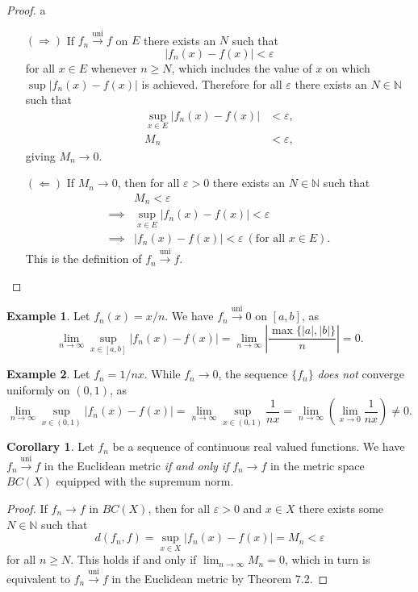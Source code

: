\documentclass{article}
\newcommand{\N}{\mathbb{N}}
\newcommand{\uni}{\overset{\text{uni}}{\to}}
\theoremstyle{definition}
\newtheorem{corollary}{Corollary}[section]
\newtheorem{example}{Example}[section]
\begin{document}
	\begin{proof}{\color{white}a}
		\begin{enumerate}
			\item [$ (\Longrightarrow) $] If $ f_n\uni f $ on $E$ there exists an $ N $ such that $$ |f_n(x)-f(x)|<\varepsilon$$ for all $ x\in E $ whenever $ n\ge N $, which includes the value of $ x $ on which $\sup |f_n(x)-f(x)| $ is achieved. Therefore for all $ \varepsilon $ there exists an $ N\in\N $ such that
			\begin{align*}
				\sup_{x\in E}|f_n(x)-f(x)|&<\varepsilon,\\M_n&<\varepsilon,
			\end{align*}
			giving $ M_n\to 0 $. 
			\item [$ (\Longleftarrow) $]  If $ M_n\to 0 $, then for all $ \varepsilon>0 $ there exists an $ N\in\N $ such that \begin{align*}
				&M_n<\varepsilon\\\implies&\sup_{x\in E}|f_n(x)-f(x)|<\varepsilon\\\implies& |f_n(x)-f(x)|<\varepsilon\ (\text{for all }x\in E).
			\end{align*} 
			This is the definition of $ f_n\uni f $. 
		\end{enumerate}
	\end{proof}
	\begin{example}
		Let $ f_n(x)=x/n $. We have $ f_n\uni 0 $ on $ [a,b] $, as $$ \lim\limits_{n\to\infty}\sup_{x\in [a,b]}|f_n(x)-f(x)|=\lim\limits_{n\to\infty}\left\lvert\frac{\max\{|a|,|b|\}}{n}\right\rvert=0.$$
	\end{example}
	\begin{example}
		Let $ f_n=1/nx $. While $ f_n\to 0 $, the sequence $ \{f_n\} $ \textit{does not} converge uniformly on $ (0,1) $, as $$ \lim\limits_{n\to\infty}\sup_{x\in (0,1)}|f_n(x)-f(x)|=\lim\limits_{n\to\infty}\sup_{x\in (0,1)}\frac{1}{nx}= \lim\limits_{n\to\infty}\left(\lim\limits_{x\to0}\frac{1}{nx}\right)\neq 0.$$
	\end{example}
	\begin{corollary}
		Let $ f_n $ be a sequence of continuous real valued functions. We have $ f_n\uni f $ in the Euclidean metric \textit{if and only if} $ f_n\to f $ in the metric space $ BC(X) $ equipped with the supremum norm.
	\end{corollary}
	\begin{proof}
		If $ f_n\to f $ in $ BC(X) $, then for all $ \varepsilon>0 $ and $ x\in X $ there exists some $ N\in\N $ such that $$ d(f_n,f)=\sup_{x\in X}|f_n(x)-f(x)|=M_n<\varepsilon$$ for all $ n\ge N $. This holds if and only if $ \lim_{n\to\infty}M_n=0 $, which in turn is equivalent to $ f_n\uni f $ in the Euclidean metric by Theorem 7.2.
	\end{proof}
\end{document}
